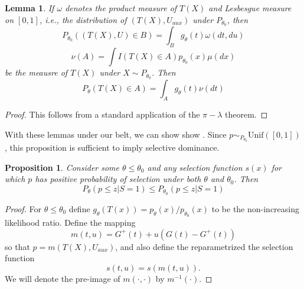 \documentclass{article}
\newtheorem{lemma}{Lemma}
\newtheorem{proposition}{Proposition}
\begin{document}
\begin{appendix}
\begin{lemma}
    \label{lem:pi_lambda}
    If $\omega$ denotes the product measure of $T(X)$ and Lesbesgue measure on $[0, 1]$, i.e., the distribution of $(T(X), U_{aux})$ under $P_{\theta_0}$, then 
    \begin{equation*}
        P_{\theta_0}((T(X), U) \in B) = \int_{B} g_{\theta}(t) \omega(dt, du)
    \end{equation*}
    \begin{equation*}
        \nu(A) = \int I(T(X) \in A) p_{\theta_0}(x) \mu(dx)
    \end{equation*}
    be the meausre of $T(X)$ under $X \sim P_{\theta_0}$. Then 
    \begin{equation*}
        P_{\theta}(T(X) \in A) = \int_A g_{\theta}(t) \nu(dt)
    \end{equation*}
\end{lemma}
\begin{proof}
    This follows from a standard application of the $\pi-\lambda$ theorem. 
\end{proof}

With these lemmas under our belt, we can show show . Since $p \sim_{P_{\theta_0}} \text{Unif}([0, 1])$, this proposition is sufficient to imply selective dominance. 

\begin{proposition}
    \label{prop:mlr_sel_dom}
    Consider some $\theta \leq \theta_0$ and any selection function $s(x)$ for which $p$ has positive probability of selection under both $\theta$ and $\theta_0$. Then 
    \begin{equation*}
        P_{\theta}(p \leq z | S = 1)  \leq P_{\theta_0}(p \leq z | S = 1)
    \end{equation*}
\end{proposition}

\begin{proof}

For $\theta \leq \theta_0$ define $g_{\theta}(T(x)) = p_{\theta}(x)/p_{\theta_0}(x)$ to be the non-increasing likelihood ratio. Define the mapping 
\begin{equation*}
    m(t, u) = G^+(t) + u(G(t) - G^+(t))
\end{equation*}
so that $p = m(T(X), U_{aux})$, and also define the reparametrized the selection function
\begin{equation*}
    s(t, u) = s(m(t, u)). 
\end{equation*}
We will denote the pre-image of $m(\cdot, \cdot)$ by $m^{-1}(\cdot)$. 


\end{proof}
\end{appendix}
\end{document}
